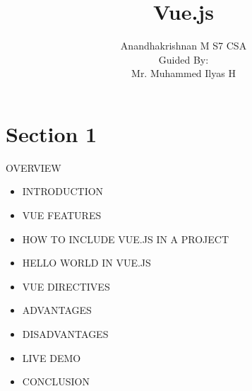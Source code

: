 \documentclass[aspectratio=169, 169]{beamer}
\title{\linebreak Vue.js}
\author{ Anandhakrishnan M\linebreak
S7 CSA \\ Guided By:\\ Mr. Muhammed Ilyas H
}
\begin{document}
\section{Section 1}

\begin{frame}
    \titlepage
\end{frame}
\begin{frame}{OVERVIEW}
\begin{itemize}
    \item INTRODUCTION
    \item VUE FEATURES
    \item HOW TO INCLUDE VUE.JS IN A PROJECT
    \item HELLO WORLD IN VUE.JS
    \item VUE DIRECTIVES
    \item ADVANTAGES
    \item DISADVANTAGES
    \item LIVE DEMO
    \item CONCLUSION
\end{itemize}
    
\end{frame}
\end{document}
